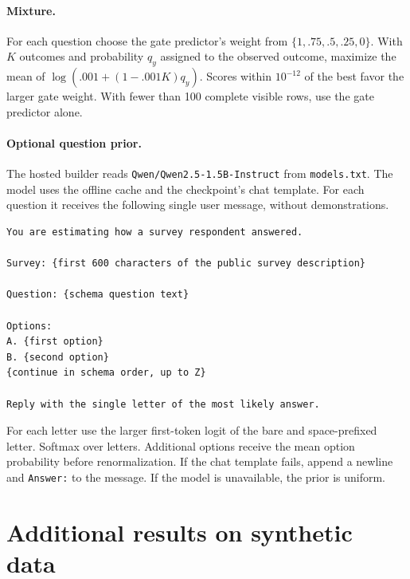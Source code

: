 \documentclass{article}
\begin{document}
\paragraph{Mixture.} For each question choose the gate predictor's weight from
$\{1,.75,.5,.25,0\}$. With $K$ outcomes and probability $q_y$ assigned to the
observed outcome, maximize the mean of $\log(.001+(1-.001K)q_y)$. Scores
within $10^{-12}$ of the best favor the larger gate weight. With fewer than
100 complete visible rows, use the gate predictor alone.
\paragraph{Optional question prior.} The hosted builder reads
\texttt{Qwen/Qwen2.5-1.5B-Instruct} from \texttt{models.txt}. The model
uses the offline cache and the checkpoint's chat template. For each question
it receives the following single user message, without demonstrations.
\begin{small}\begin{verbatim}
You are estimating how a survey respondent answered.

Survey: {first 600 characters of the public survey description}

Question: {schema question text}

Options:
A. {first option}
B. {second option}
{continue in schema order, up to Z}

Reply with the single letter of the most likely answer.
\end{verbatim}\end{small}
For each letter use the larger first-token logit of the bare and space-prefixed
letter. Softmax over letters. Additional options receive the mean option
probability before renormalization. If the chat template fails, append a
newline and \texttt{Answer:} to the message. If the model is unavailable,
the prior is uniform.

\newpage
\section{Additional results on synthetic data}\label{results-local}

\end{document}
